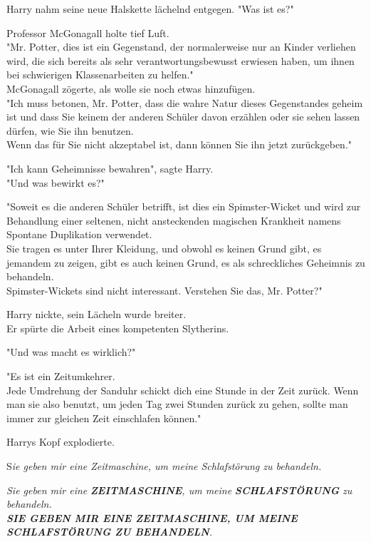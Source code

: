 {Harry nahm seine neue Halskette lächelnd entgegen. "Was ist es?"

Professor McGonagall holte tief Luft.\\ "Mr. Potter, dies ist ein Gegenstand, der normalerweise nur an Kinder verliehen wird, die sich bereits als sehr verantwortungsbewusst erwiesen haben, um ihnen bei schwierigen Klassenarbeiten zu helfen."\\ McGonagall zögerte, als wolle sie noch etwas hinzufügen.\\ "Ich muss betonen, Mr. Potter, dass die wahre Natur dieses Gegenstandes geheim ist und dass Sie keinem der anderen Schüler davon erzählen oder sie sehen lassen dürfen, wie Sie ihn benutzen.\\ Wenn das für Sie nicht akzeptabel ist, dann können Sie ihn jetzt zurückgeben."

"Ich kann Geheimnisse bewahren", sagte Harry.\\ "Und was bewirkt es?"

"Soweit es die anderen Schüler betrifft, ist dies ein Spimster-Wicket und wird zur Behandlung einer seltenen, nicht ansteckenden magischen Krankheit namens Spontane Duplikation verwendet.\\ Sie tragen es unter Ihrer Kleidung, und obwohl es keinen Grund gibt, es jemandem zu zeigen, gibt es auch keinen Grund, es als schreckliches Geheimnis zu behandeln.\\ Spimster-Wickets sind nicht interessant. Verstehen Sie das, Mr. Potter?"

Harry nickte, sein Lächeln wurde breiter.\\ Er spürte die Arbeit eines kompetenten Slytherins.

"Und was macht es wirklich?"

"Es ist ein Zeitumkehrer.\\ Jede Umdrehung der Sanduhr schickt dich eine Stunde in der Zeit zurück. Wenn man sie also benutzt, um jeden Tag zwei Stunden zurück zu gehen, sollte man immer zur gleichen Zeit einschlafen können."

Harrys Kopf explodierte.

S\emph{ie geben mir eine Zeitmaschine, um meine Schlafstörung zu behandeln.}

\emph{Sie geben mir eine} \textbf{\emph{ZEITMASCHINE}}\emph{, um meine} \textbf{\emph{SCHLAFSTÖRUNG}} \emph{zu behandeln.}\\ \emph{\hfill\break }\textbf{\emph{SIE GEBEN MIR EINE ZEITMASCHINE, UM MEINE SCHLAFSTÖRUNG ZU BEHANDELN}}\emph{.}

}
